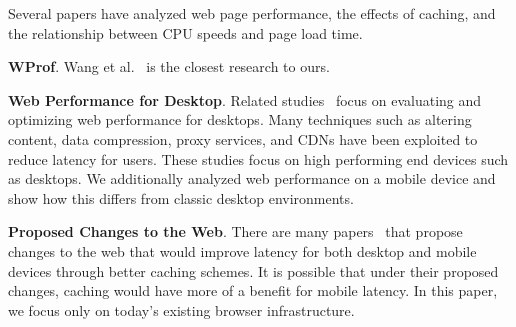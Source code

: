 

Several papers have analyzed web page performance, the effects of caching, and the relationship between CPU speeds and page load time.

\textbf{WProf}. Wang et al.~\cite{wang2013demystifying} is the closest research to ours.

%


\textbf{Web Performance for Desktop}. Related studies~\cite{web-perf-2, web-perf-3} focus on evaluating and optimizing web performance for desktops. Many techniques such as altering content, data compression, proxy services, and CDNs have been exploited to reduce latency for users. These studies focus on high performing end devices such as desktops. We additionally analyzed web performance on a mobile device and show how this differs from classic desktop environments.

\textbf{Proposed Changes to the Web}. There are many papers~\cite{web-perf-4-new-design, web-caching-4-new-design, web-caching-5-new-design, web-caching-latency-1-new-design, web-caching-latency-2-new-design, web-caching-latency-3-new-design, web-caching-latency-5-new-design, web-caching-latency-6-new-design, web-caching-latency-7-new-design} that propose changes to the web that would improve latency for both desktop and mobile devices through better caching schemes. It is possible that under their proposed changes, caching would have more of a benefit for mobile latency. In this paper, we focus only on today's existing browser infrastructure. %

